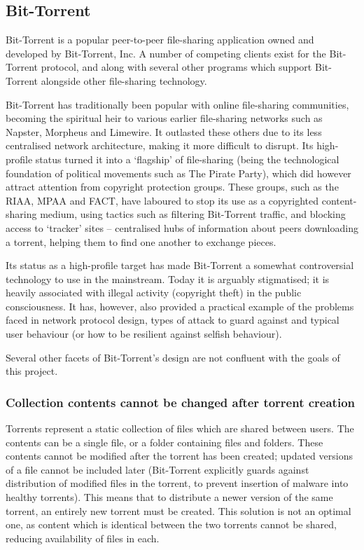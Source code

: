 \documentclass[12pt,a4paper,]{adreport}
\begin{document}
\subsection{Bit-Torrent}\label{bit-torrent}

Bit-Torrent is a popular peer-to-peer file-sharing application owned and
developed by Bit-Torrent, Inc. A number of competing clients exist for
the Bit-Torrent protocol, and along with several other programs which
support Bit-Torrent alongside other file-sharing technology.

Bit-Torrent has traditionally been popular with online file-sharing
communities, becoming the spiritual heir to various earlier file-sharing
networks such as Napster, Morpheus and Limewire. It outlasted these
others due to its less centralised network architecture, making it more
difficult to disrupt. Its high-profile status turned it into a
`flagship' of file-sharing (being the technological foundation of
political movements such as The Pirate Party), which did however attract
attention from copyright protection groups. These groups, such as the
RIAA, MPAA and FACT, have laboured to stop its use as a copyrighted
content-sharing medium, using tactics such as filtering Bit-Torrent
traffic, and blocking access to `tracker' sites -- centralised hubs of
information about peers downloading a torrent, helping them to find one
another to exchange pieces.

Its status as a high-profile target has made Bit-Torrent a somewhat
controversial technology to use in the mainstream. Today it is arguably
stigmatised; it is heavily associated with illegal activity (copyright
theft) in the public consciousness. It has, however, also provided a
practical example of the problems faced in network protocol design,
types of attack to guard against and typical user behaviour (or how to
be resilient against selfish behaviour).

Several other facets of Bit-Torrent's design are not confluent with the
goals of this project.

\subsubsection{Collection contents cannot be changed after torrent
creation}\label{collection-contents-cannot-be-changed-after-torrent-creation}

Torrents represent a static collection of files which are shared between
users. The contents can be a single file, or a folder containing files
and folders. These contents cannot be modified after the torrent has
been created; updated versions of a file cannot be included later
(Bit-Torrent explicitly guards against distribution of modified files in
the torrent, to prevent insertion of malware into healthy torrents).
This means that to distribute a newer version of the same torrent, an
entirely new torrent must be created. This solution is not an optimal
one, as content which is identical between the two torrents cannot be
shared, reducing availability of files in each.
\end{document}
